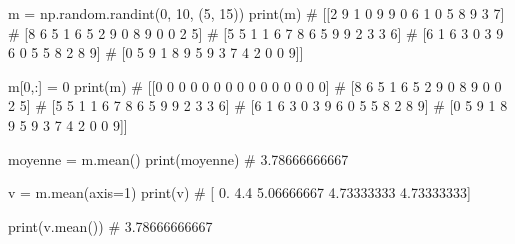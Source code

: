 \documentclass[10pt,fleqn]{article} %
\begin{document}
\begin{multicols}{2}
\begin{corrige}
\begin{python}
m = np.random.randint(0, 10, (5, 15))
print(m)
# [[2 9 1 0 9 9 0 6 1 0 5 8 9 3 7]
#  [8 6 5 1 6 5 2 9 0 8 9 0 0 2 5]
#  [5 5 1 1 6 7 8 6 5 9 9 2 3 3 6]
#  [6 1 6 3 0 3 9 6 0 5 5 8 2 8 9]
#  [0 5 9 1 8 9 5 9 3 7 4 2 0 0 9]]

m[0,:] = 0
print(m)
# [[0 0 0 0 0 0 0 0 0 0 0 0 0 0 0]
#  [8 6 5 1 6 5 2 9 0 8 9 0 0 2 5]
#  [5 5 1 1 6 7 8 6 5 9 9 2 3 3 6]
#  [6 1 6 3 0 3 9 6 0 5 5 8 2 8 9]
#  [0 5 9 1 8 9 5 9 3 7 4 2 0 0 9]]

moyenne = m.mean()
print(moyenne)
# 3.78666666667

v = m.mean(axis=1)
print(v)
# [ 0.          4.4         5.06666667  4.73333333  4.73333333]

print(v.mean())
# 3.78666666667
\end{python}
\end{corrige}
\else
\fi


%


%
%
%
%
%
%
%
%
%

\ifprof
\else
\end{multicols}
\fi
\end{document}
